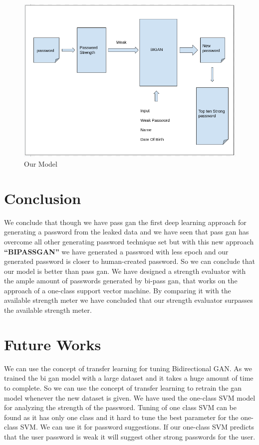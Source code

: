 \documentclass[runningheads]{llncs}
\newcommand{\quotes}[1]{``#1''}
\begin{document}
\begin{figure}
  \centering
\begin{minipage}[b]{0.8\textwidth}
  \begin{mdframed}
    \includegraphics[width=\textwidth]{ab.png}
    \end{mdframed}
    \caption{Our Model}
  \end{minipage}
\end{figure}
\section{Conclusion}

We conclude that though we have pass gan the first deep learning approach for generating a password from the leaked data and we have seen that pass gan has overcome all other generating password technique set but with this new approach \textbf{\quotes{BIPASSGAN}} we have generated a password with less epoch and our generated password is closer to human-created password. So we can conclude that our model is better than pass gan.  We have designed a strength evaluator with the ample amount of passwords generated by bi-pass gan,  that works on the approach of a one-class support vector machine. By comparing it with the available strength meter we have concluded that our strength evaluator surpasses the available strength meter.

\section{Future Works}
We can use the concept of transfer learning for tuning Bidirectional GAN. As we trained the bi gan model with a large dataset and it takes a huge amount of time to complete. So we can use the concept of transfer learning to retrain the gan model whenever the new dataset is given. We have used the one-class SVM model for analyzing the strength of the password. Tuning of one class SVM can be found as it has only one class and it hard to tune the best parameter for the one-class SVM. We can use it for password suggestions. If our one-class SVM predicts that the user password is weak it will suggest other strong passwords for the user.
\end{document}
